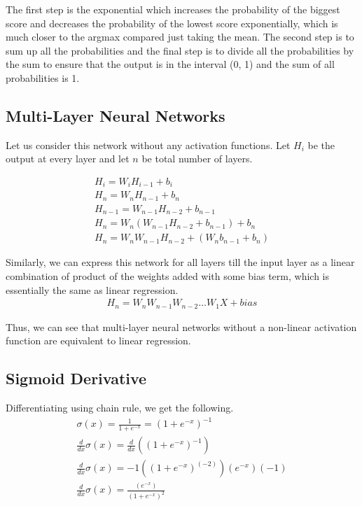 \documentclass[a4paper]{article}
\begin{document}
\subsubsection{}
The first step is the exponential which increases the probability of the biggest score and decreases the probability of the lowest score exponentially, which is much closer to the argmax compared just taking the mean. The second step is to sum up all the probabilities and the final step is to divide all the probabilities by the sum to ensure that the output is in the interval (0, 1) and the sum of all probabilities is 1.

\subsection{Multi-Layer Neural Networks}
Let us consider this network without any activation functions. Let $H_{i}$ be the output at every layer and let $n$ be total number of layers. 

\begin{equation}
\begin{gathered}
    H_{i} = W_{i}H_{i-1} + b_{i} \\
    H_{n} = W_{n}H_{n-1} + b_{n} \\
    H_{n-1} = W_{n-1}H_{n-2} + b_{n-1} \\
    H_{n} = W_{n}(W_{n-1}H_{n-2} + b_{n-1}) + b_{n} \\
    H_{n} = W_{n}W_{n-1}H_{n-2} + (W_{n}b_{n-1} + b_{n})
\end{gathered}
\end{equation}

Similarly, we can express this network for all layers till the input layer as a linear combination of product of the weights added with some bias term, which is essentially the same as linear regression.
\begin{gather}
    H_{n} = W_{n}W_{n-1}W_{n-2} \dots W_{1}X + bias
\end{gather}

Thus, we can see that multi-layer neural networks without a non-linear
activation function are equivalent to linear regression.

\subsection{Sigmoid Derivative}
Differentiating using chain rule, we get the following.
\begin{equation}
\begin{gathered}
    \sigma ( x ) = \frac { 1 } { 1 + e ^ { - x } } = \left( 1 + e ^ { - x } \right) ^ { - 1 } \\
    \frac { d } { d x } \sigma ( x ) = \frac { d } { d x } \left( \left( 1 + e ^ { - x } \right) ^ { - 1 } \right) \\
    \frac { d } { d x } \sigma ( x ) = - 1 \left( \left( 1 + e ^ { - x } \right) ^ { ( - 2 ) } \right) \left( e ^ { - x } \right) ( - 1 ) \\
    \frac { d } { d x } \sigma ( x ) = \frac { \left( e ^ { - x } \right) } { \left( 1 + e ^ { - x } \right) ^ { 2 } }
\end{gathered}
\end{equation}
\end{document}
